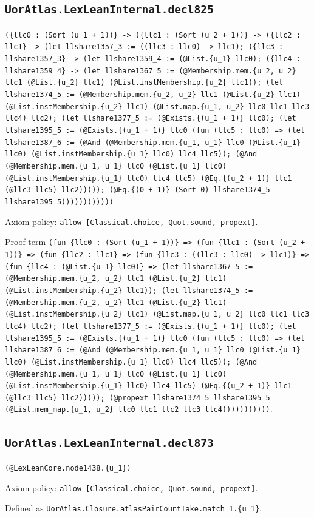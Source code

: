 \documentclass[11pt]{article}
\begin{document}
\subsection*{\texttt{UorAtlas.LexLeanInternal.decl825}}
\noindent\texttt{(\{llc0 : (Sort (u\_1 + 1))\} -> (\{llc1 : (Sort (u\_2 + 1))\} -> (\{llc2 : llc1\} -> (let llshare1357\_3 := ((llc3 : llc0) -> llc1); (\{llc3 : llshare1357\_3\} -> (let llshare1359\_4 := (@List.\{u\_1\} llc0); (\{llc4 : llshare1359\_4\} -> (let llshare1367\_5 := (@Membership.mem.\{u\_2, u\_2\} llc1 (@List.\{u\_2\} llc1) (@List.instMembership.\{u\_2\} llc1)); (let llshare1374\_5 := (@Membership.mem.\{u\_2, u\_2\} llc1 (@List.\{u\_2\} llc1) (@List.instMembership.\{u\_2\} llc1) (@List.map.\{u\_1, u\_2\} llc0 llc1 llc3 llc4) llc2); (let llshare1377\_5 := (@Exists.\{(u\_1 + 1)\} llc0); (let llshare1395\_5 := (@Exists.\{(u\_1 + 1)\} llc0 (fun (llc5 : llc0) => (let llshare1387\_6 := (@And (@Membership.mem.\{u\_1, u\_1\} llc0 (@List.\{u\_1\} llc0) (@List.instMembership.\{u\_1\} llc0) llc4 llc5)); (@And (@Membership.mem.\{u\_1, u\_1\} llc0 (@List.\{u\_1\} llc0) (@List.instMembership.\{u\_1\} llc0) llc4 llc5) (@Eq.\{(u\_2 + 1)\} llc1 (@llc3 llc5) llc2))))); (@Eq.\{(0 + 1)\} (Sort 0) llshare1374\_5 llshare1395\_5))))))))))))}\par
\noindent Axiom policy: \texttt{allow [Classical.choice, Quot.sound, propext]}.\par
\noindent Proof term \texttt{(fun \{llc0 : (Sort (u\_1 + 1))\} => (fun \{llc1 : (Sort (u\_2 + 1))\} => (fun \{llc2 : llc1\} => (fun \{llc3 : ((llc3 : llc0) -> llc1)\} => (fun \{llc4 : (@List.\{u\_1\} llc0)\} => (let llshare1367\_5 := (@Membership.mem.\{u\_2, u\_2\} llc1 (@List.\{u\_2\} llc1) (@List.instMembership.\{u\_2\} llc1)); (let llshare1374\_5 := (@Membership.mem.\{u\_2, u\_2\} llc1 (@List.\{u\_2\} llc1) (@List.instMembership.\{u\_2\} llc1) (@List.map.\{u\_1, u\_2\} llc0 llc1 llc3 llc4) llc2); (let llshare1377\_5 := (@Exists.\{(u\_1 + 1)\} llc0); (let llshare1395\_5 := (@Exists.\{(u\_1 + 1)\} llc0 (fun (llc5 : llc0) => (let llshare1387\_6 := (@And (@Membership.mem.\{u\_1, u\_1\} llc0 (@List.\{u\_1\} llc0) (@List.instMembership.\{u\_1\} llc0) llc4 llc5)); (@And (@Membership.mem.\{u\_1, u\_1\} llc0 (@List.\{u\_1\} llc0) (@List.instMembership.\{u\_1\} llc0) llc4 llc5) (@Eq.\{(u\_2 + 1)\} llc1 (@llc3 llc5) llc2))))); (@propext llshare1374\_5 llshare1395\_5 (@List.mem\_map.\{u\_1, u\_2\} llc0 llc1 llc2 llc3 llc4)))))))))))}.\par
\subsection*{\texttt{UorAtlas.LexLeanInternal.decl873}}
\noindent\texttt{(@LexLeanCore.node1438.\{u\_1\})}\par
\noindent Axiom policy: \texttt{allow [Classical.choice, Quot.sound, propext]}.\par
\noindent Defined as \texttt{UorAtlas.Closure.atlasPairCountTake.match\_1.\{u\_1\}}.\par
\end{document}
